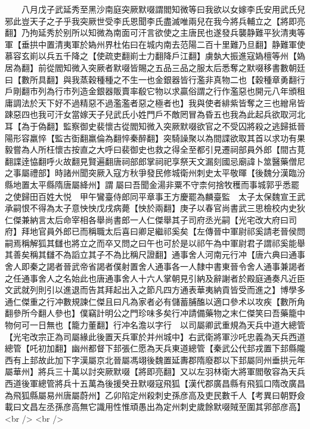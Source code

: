 　　八月戊子武延秀至黑沙南庭突厥默啜謂閻知微等曰我欲以女嫁李氏安用武氏兒邪此豈天子之子乎我突厥世受李氏恩聞李氏盡滅唯兩兒在我今將兵輔立之【將即亮翻】乃拘延秀於别所以知微為南面可汗言欲使之主唐民也遂發兵襲静難平狄清夷等軍【垂拱中置清夷軍於媯州界杜佑曰在城内南去范陽二百十里難乃旦翻】静難軍使慕容玄崱以兵五千降之【使疏吏翻崱士力翻降戶江翻】虜埶大振進寇媯檀等州【媯居為翻】前從閻知微入突厥者默啜皆賜之五品三品之服太后悉奪之默啜移書數朝廷曰【數所具翻】與我蒸穀種種之不生一也金銀器皆行濫非真物二也【穀種章勇翻行戶剛翻市列為行市列造金銀器販賣率殽它物以求贏俗謂之行作濫惡也開元八年頒租庸調法於天下好不過精惡不過濫濫者惡之極者也】我與使者緋紫皆奪之三也繒帛皆踈惡四也我可汗女當嫁天子兒武氏小姓門戶不敵罔冒為昏五也我為此起兵欲取河北耳【為于偽翻】監察御史裴懷古從閻知微入突厥默啜欲官之不受囚將殺之逃歸抵晉陽形容羸悴【監古衘翻羸倫為翻悴秦醉翻】突騎譟聚以為間諜欲取其首以求功有果毅嘗為人所枉懷古按直之大呼曰裴御史也救之得全至都引見遷祠部員外郎【間古莧翻諜逹恊翻呼火故翻見賢遍翻唐祠部郎掌祠祀享祭天文漏刻國忌廟諱卜筮醫藥僧尼之事屬禮部】時諸州聞突厥入寇方秋爭發民修城衛州刺史太平敬暉【後魏分漢臨汾縣地置太平縣隋唐屬絳州】謂屬曰吾聞金湯非粟不守柰何捨牧穫而事城郭乎悉罷之使歸田百姓大悦　甲午鸞臺侍郎同平章事王方慶罷為麟臺監　太子太保魏宣王武承嗣恨不得為太子意怏怏戊戌病薨【怏於兩翻】庚子以春官尚書武三思檢校内史狄仁傑兼納言太后命宰相各舉尚書郎一人仁傑舉其子司府丞光嗣【光宅改大府曰司府】拜地官員外郎已而稱職太后喜曰卿足繼祁奚矣【左傳晉中軍尉祁奚請老晉侯問嗣焉稱解狐其讎也將立之而卒又問之曰午也可於是以祁午為中軍尉君子謂祁奚能舉其善矣稱其讎不為謟立其子不為比稱尺證翻】通事舍人河南元行冲【唐六典曰通事舍人即秦之謁者晉武帝省謁者僕射置舍人通事各一人隸中書東晉令舍人通事兼謁者之任通事舍人之名始此也唐通事舍人十六人掌朝見引納及辭謝者於殿庭通奏凡近臣文武就列則引以進退而告其拜起出入之節凡四方通表華夷納貢皆受而進之】博學多通仁傑重之行冲數規諫仁傑且曰凡為家者必有儲蓄脯醢以適口參术以攻疾【數所角翻參所今翻人參也】僕竊計明公之門珍味多矣行冲請備藥物之末仁傑笑曰吾藥籠中物何可一日無也【籠力董翻】行冲名澹以字行　以司屬卿武重規為天兵中道大總管【光宅改宗正為司屬緣此後置天兵軍於并州城中】右武衛將軍沙吒忠義為天兵西道總管【吒初加翻】幽州都督下邽張仁愿為天兵東道總管【秦武公代邽戎置下邽縣隴西有上邽故此加下字漢屬京北晉屬馮翊後魏置延夀郡隋廢郡以下邽屬同州垂拱元年屬華州】將兵三十萬以討突厥默啜【將即亮翻】又以左羽林衛大將軍閻敬容為天兵西道後軍總管將兵十五萬為後援癸丑默啜寇飛狐【漢代郡廣昌縣有飛狐口隋改廣昌為飛狐縣屬易州唐屬蔚州】乙卯陷定州殺刺史孫彦高及吏民數千人【考異曰朝野僉載曰文昌左丞孫彦高無它識用性惟頑愚出為定州刺史歲餘默啜賊至圍其郛部彦高】<br />
<br />
